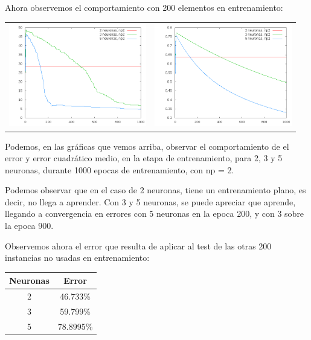\documentclass[12pt]{article}
\begin{document}
Ahora observemos el comportamiento con 200 elementos en entrenamiento:

\begin{center}
   \begin{tabular}{ c  c }
     \includegraphics[width=6cm]{graficosparte2a/error_train_np2} &
     \includegraphics[width=6cm]{graficosparte2a/ecm_train_np2}\\ 
   \end{tabular}
 \end{center}

Podemos, en las gráficas que vemos arriba, observar el comportamiento de el error y error cuadrático medio, en la etapa de entrenamiento, para 2, 3 y 5 neuronas, durante 1000 epocas de entrenamiento, con np = 2.

Podemos observar que en el caso de 2 neuronas, tiene un entrenamiento plano, es decir, no llega a aprender. Con 3 y 5 neuronas, se puede apreciar que aprende, llegando a convergencia en errores con 5 neuronas en la epoca 200, y con 3 sobre la epoca 900.

Observemos ahora el error que resulta de aplicar al test de las otras 200 instancias no usadas en entrenamiento:

\begin{center}
	\begin{tabular}{| c | c |}
		\hline
		Neuronas & Error \\ \hline
		2 & 46.733\% \\ \hline
		3 & 59.799\% \\ \hline
		5 & 78.8995\% \\ \hline
	\end{tabular}
\end{center}
\end{document}
